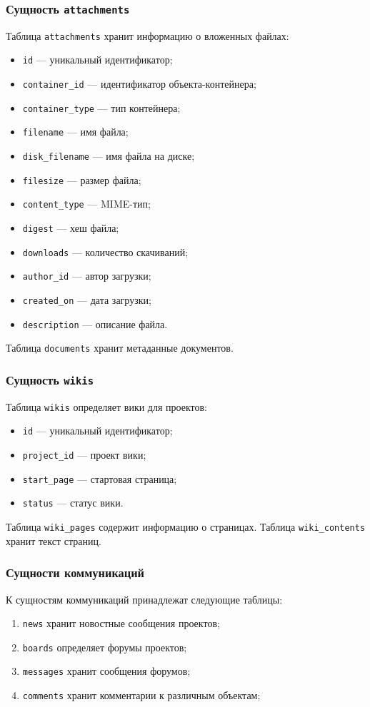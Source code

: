 \subsubsection{Сущность \texttt{attachments}}

Таблица \texttt{attachments} хранит информацию о вложенных файлах:
\begin{itemize}
    \item \texttt{id} --- уникальный идентификатор;
    \item \texttt{container\_id} --- идентификатор объекта-контейнера;
    \item \texttt{container\_type} --- тип контейнера;
    \item \texttt{filename} --- имя файла;
    \item \texttt{disk\_filename} --- имя файла на диске;
    \item \texttt{filesize} --- размер файла;
    \item \texttt{content\_type} --- MIME-тип;
    \item \texttt{digest} --- хеш файла;
    \item \texttt{downloads} --- количество скачиваний;
    \item \texttt{author\_id} --- автор загрузки;
    \item \texttt{created\_on} --- дата загрузки;
    \item \texttt{description} --- описание файла.
\end{itemize}
Таблица \texttt{documents} хранит метаданные документов.


\subsubsection{Сущность \texttt{wikis}}
Таблица \texttt{wikis} определяет вики для проектов:

\begin{itemize}
    \item \texttt{id} --- уникальный идентификатор;
    \item \texttt{project\_id} --- проект вики;
    \item \texttt{start\_page} --- стартовая страница;
    \item \texttt{status} --- статус вики.
\end{itemize}

Таблица \texttt{wiki\_pages} содержит информацию о страницах.
Таблица \texttt{wiki\_contents} хранит текст страниц.

\subsubsection{Сущности коммуникаций}
К сущностям коммуникаций принадлежат следующие таблицы:
\begin{enumerate}
    \item \texttt{news} хранит новостные сообщения проектов;
    \item \texttt{boards} определяет форумы проектов;
    \item \texttt{messages} хранит сообщения форумов;
    \item \texttt{comments} хранит комментарии к различным объектам;
\end{enumerate}

